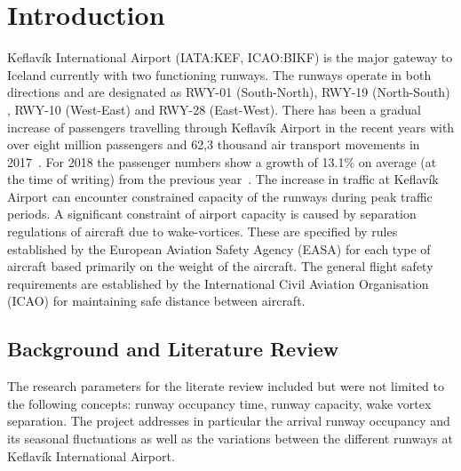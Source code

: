 \chapter{Introduction\label{cha:introduction}}

Keflavík International Airport (IATA:KEF, ICAO:BIKF) is the major gateway to Iceland currently with two functioning runways. The runways operate in both directions and are designated as RWY-01 (South-North), RWY-19 (North-South) , RWY-10 (West-East) and RWY-28 (East-West). 
There has been a gradual increase of passengers travelling through Keflavík Airport in the recent years with over eight million passengers and 62,3 thousand air transport movements in 2017~\cite{isavia_facts_2017}. For 2018 the passenger numbers show a growth of 13.1\% on average (at the time of writing) from the previous year~\cite{isavia_pass_statistics_2018}. The increase in traffic at Keflavík Airport can encounter constrained capacity of the runways during peak traffic periods. 
A significant constraint of airport capacity is caused by separation regulations of aircraft due to wake-vortices. These are specified by rules established by the European Aviation Safety Agency (EASA) for each type of aircraft based primarily on the weight of the aircraft. The general flight safety requirements are established by the International Civil Aviation Organisation (ICAO) for maintaining safe distance between aircraft.

\section{Background and Literature Review}
The research parameters for the literate review included but were not limited to the following concepts: runway occupancy time, runway capacity, wake vortex separation. The project addresses in particular the arrival runway occupancy and its seasonal fluctuations as well as the variations between the different runways at Keflavík International Airport.

